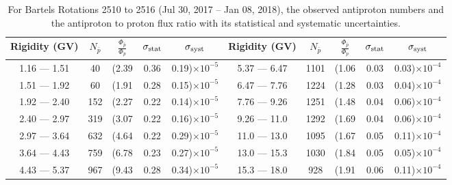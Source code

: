 \begin{table}[p] 
\renewcommand\baselinestretch{1.3}\selectfont
\setlength\tabcolsep{3pt}
\centering
\begin{tabular}{ccccc | ccccc}
\hline
\textbf{Rigidity}  (GV)  & $N_{\bar{p}}$ & $\frac{\Phi_{\bar{p}}}{\Phi_{p}}$ & $\sigma_{\rm{stat}}$ & $\sigma_{\rm{syst}}$ \hspace{1cm}   & \textbf{Rigidity}  (GV)  & $N_{\bar{p}}$ & $\frac{\Phi_{\bar{p}}}{\Phi_{p}}$ & $\sigma_{\rm{stat}}$ & $\sigma_{\rm{syst}}$ \hspace{1cm} \\ 
\hline
1.16 — 1.51   &  40                  &(2.39                          &  0.36              &      0.19)$\times 10^{-5}$  & 5.37 — 6.47                &  1101                    &(1.06                                &  0.03                   &      0.03)$\times 10^{-4}$\\
1.51 — 1.92   &  60                  &(1.91                          &  0.28              &      0.15)$\times 10^{-5}$  & 6.47 — 7.76                &  1224                    &(1.28                                &  0.03                   &      0.04)$\times 10^{-4}$\\
1.92 — 2.40   &  152                &(2.27                          &  0.22              &      0.14)$\times 10^{-5}$  & 7.76 — 9.26                &  1251                    &(1.48                                &  0.04                   &      0.06)$\times 10^{-4}$\\    
2.40 — 2.97   &  319                &(3.07                          &  0.22              &      0.16)$\times 10^{-5}$  & 9.26 — 11.0                &  1292                    &(1.69                                &  0.04                   &      0.06)$\times 10^{-4}$\\    
2.97 — 3.64   &  632                &(4.64                          &  0.22              &      0.29)$\times 10^{-5}$  & 11.0 — 13.0                 &  1095                    &(1.67                                &  0.05                   &      0.11)$\times 10^{-4}$\\
3.64 — 4.43   &  759                &(6.78                          &  0.23              &      0.27)$\times 10^{-5}$  & 13.0 — 15.3               &  1030                    &(1.84                                &  0.05                   &      0.05)$\times 10^{-4}$\\
4.43 — 5.37   &  967                &(9.43                          &  0.28              &      0.34)$\times 10^{-5}$  & 15.3 — 18.0               &  928                      &(1.91                                &  0.06                   &      0.11)$\times 10^{-4}$\\
\hline
\end{tabular}
\caption[Antiproton to proton flux ratio for Bartels Rotations 2510 to 2516]{For Bartels Rotations 2510 to 2516 (Jul 30, 2017 – Jan 08, 2018), the observed antiproton numbers and the antiproton to proton flux ratio with its statistical and systematic uncertainties.}
\label{TableOfDependent15}
\end{table}

